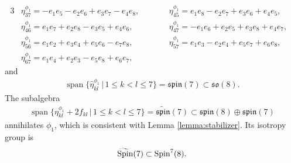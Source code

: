 \documentclass[pdftex]{sigma}
\numberwithin{equation}{section}
\begin{document}
{\begin{alignat*}{3}
& \eta^{\phi_1}_{3 7} = -e_{1} e_{5} - e_{2} e_{6} + e_{3} e_{7} - e_{4} e_{8},\qquad &&
 \eta^{\phi_1}_{4 5} = e_{1} e_{8} - e_{2} e_{7} + e_{3} e_{6} + e_{4} e_{5},&\\
& \eta^{\phi_1}_{4 6} = e_{1} e_{7} + e_{2} e_{8} - e_{3} e_{5} + e_{4} e_{6},\qquad &&
 \eta^{\phi_1}_{4 7} = -e_{1} e_{6} + e_{2} e_{5} + e_{3} e_{8} + e_{4} e_{7},&\\
& \eta^{\phi_1}_{5 6} = e_{1} e_{2} + e_{3} e_{4} + e_{5} e_{6} - e_{7} e_{8},\qquad &&
 \eta^{\phi_1}_{5 7} = e_{1} e_{3} - e_{2} e_{4} + e_{5} e_{7} + e_{6} e_{8},&\\
& \eta^{\phi_1}_{6 7} = e_{1} e_{4} + e_{2} e_{3} - e_{5} e_{8} + e_{6} e_{7},\qquad &&&
\end{alignat*}
and
\begin{gather*}\operatorname{span}\big\{\hat\eta_{kl}^{\phi_1} \,|\, 1\leq k<l\leq 7 \big\} = \mathfrak{spin}(7) \subset \mathfrak{so}(8).\end{gather*}
The subalgebra
\begin{gather*}\operatorname{span}\big\{\eta_{kl}^{\phi_1} + 2 f_{kl}\,|\, 1\leq k<l\leq 7 \big\} = \widetilde{\mathfrak{spin}}(7) \subset
\mathfrak{spin}(8)\oplus \mathfrak{spin}(7)\end{gather*}
annihilates ${\phi_1}$, which is consistent with Lemma \ref{lemma:stabilizer}. Its isotropy group is
\begin{gather*}\widetilde{\rm Spin}(7)\subset {\rm Spin}^7(8).\end{gather*}

}
\end{document}
